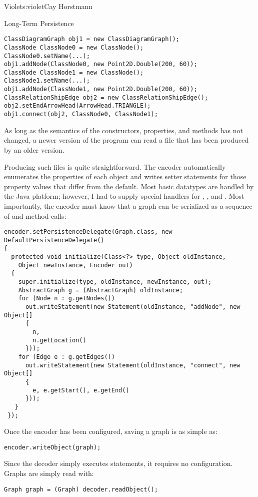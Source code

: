 \begin{aosachapter}{Violet}{s:violet}{Cay Horstmann}
\begin{aosasect1}{Long-Term Persistence}
\begin{verbatim}
ClassDiagramGraph obj1 = new ClassDiagramGraph();
ClassNode ClassNode0 = new ClassNode();
ClassNode0.setName(...);
obj1.addNode(ClassNode0, new Point2D.Double(200, 60));
ClassNode ClassNode1 = new ClassNode();
ClassNode1.setName(...);
obj1.addNode(ClassNode1, new Point2D.Double(200, 60));
ClassRelationShipEdge obj2 = new ClassRelationShipEdge();
obj2.setEndArrowHead(ArrowHead.TRIANGLE);
obj1.connect(obj2, ClassNode0, ClassNode1);
\end{verbatim}

As long as the semantics of the constructors, properties, and methods
has not changed, a newer version of the program can read a file that
has been produced by an older version.

Producing such files is quite straightforward. The encoder
automatically enumerates the properties of each object and writes
setter statements for those property values that differ from the
default. Most basic datatypes are handled by the Java platform;
however, I had to supply special handlers for ,
, and . Most importantly,
the encoder must know that a graph can be serialized as a sequence of
 and  method calls:

\begin{verbatim}
encoder.setPersistenceDelegate(Graph.class, new DefaultPersistenceDelegate()
{
  protected void initialize(Class<?> type, Object oldInstance, 
    Object newInstance, Encoder out)
  {
    super.initialize(type, oldInstance, newInstance, out);
    AbstractGraph g = (AbstractGraph) oldInstance;
    for (Node n : g.getNodes())
      out.writeStatement(new Statement(oldInstance, "addNode", new Object[]
      {
        n, 
        n.getLocation()
      }));
    for (Edge e : g.getEdges())
      out.writeStatement(new Statement(oldInstance, "connect", new Object[]
      {
        e, e.getStart(), e.getEnd()
      }));
   } 
 });
\end{verbatim}

Once the encoder has been configured, saving a graph is as simple as:

\begin{verbatim}
encoder.writeObject(graph);
\end{verbatim}

\noindent Since the decoder simply executes statements, it requires no
configuration.  Graphs are simply read with:

\begin{verbatim}
Graph graph = (Graph) decoder.readObject();
\end{verbatim}


\end{aosasect1}
\end{aosachapter}
